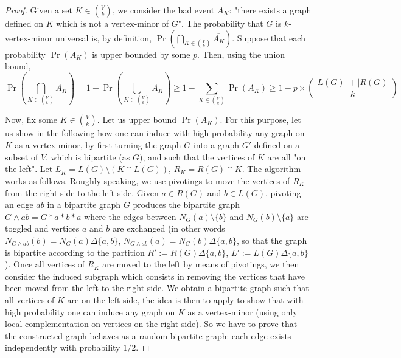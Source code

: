 \documentclass[a4paper,UKenglish,cleveref, autoref, thm-restate]{arxiv}
\newcommand{\gs}{\geqslant}
\newcommand{\sm}{\setminus}
\begin{document}
\begin{proof}
    Given a set $K \in {V \choose k}$, we consider the bad event $A_K$: "there exists a graph defined on $K$ which is not a vertex-minor of $G$". The probability that $G$ is $k$-vertex-minor universal is, by definition, $\Pr\left( \bigcap_{K \in {V \choose k}} \overline{A_K}\right)$. Suppose that each probability $\Pr(A_K)$ is upper bounded by some $p$. Then, using the union bound, $$\Pr\left( \bigcap_{K \in {V \choose k}} \overline{A_K}\right) = 1 - \Pr\left(\bigcup_{K \in {V \choose k}} A_K \right) \gs 1 - \sum_{K \in {V \choose k}} \Pr(A_K) \gs 1 - p\times {|L(G)|+|R(G)| \choose k}$$

    Now, fix some $K \in {V \choose k}$. Let us upper bound $\Pr(A_K)$. For this purpose, let us show in the following how one can induce with high probability any graph on $K$ as a vertex-minor, by first turning the graph $G$ into a graph $G'$ defined on a subset of $V$, which is bipartite (as $G$), and such that the vertices of $K$ are all "on the left". Let $L_{\overline K}=L(G)\sm (K\cap L(G))$, $R_K=R(G)\cap K$. The algorithm works as follows. Roughly speaking, we use pivotings to move the vertices of $R_K$ from the right side to the left side. Given $a\in R(G)$ and $b\in L(G)$, pivoting an edge $ab$ in a bipartite graph $G$ produces the bipartite graph $G\wedge ab=G*a*b*a$ where the edges between $N_G(a)\setminus \{b\}$ and $N_G(b)\setminus \{a\}$ are toggled and vertices $a$ and $b$ are exchanged (in other words $N_{G\wedge ab}(b)=N_G(a)\Delta \{a,b\}$, $N_{G\wedge ab}(a)=N_G(b)\Delta \{a,b\}$, so that the graph is bipartite according to the partition $R':=R(G)\Delta\{a,b\}$, $L':=L(G)\Delta\{a,b\}$). Once all vertices of $R_K$ are moved to the left by means of pivotings, we then consider the induced subgraph which consists in removing the vertices that have been moved from the left to the right side. We obtain a bipartite graph such that all vertices of $K$ are on the left side, the idea is then to apply  to show that with high probability one can induce any graph on $K$ as a vertex-minor (using only local complementation on vertices on the right side). So we have to prove that the constructed graph behaves as a random bipartite graph: each edge exists independently with probability $1/2$.


\end{proof}
\end{document}

